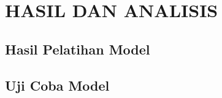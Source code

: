 
\chapter{HASIL DAN ANALISIS} \label{cha:4-HasilDanAnalisis}

\section{Hasil Pelatihan Model} \label{sec:4-PersiapanPengujian}

\section{Uji Coba Model} \label{sec:4-PersiapanPengujian}
